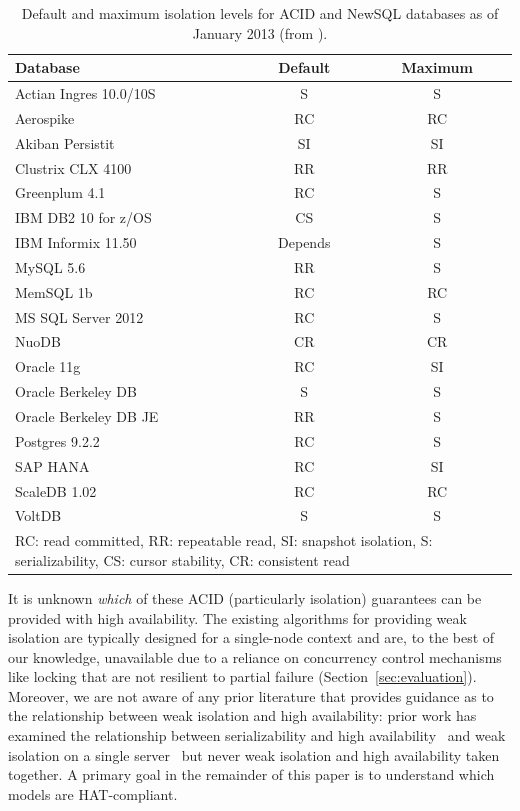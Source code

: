\begin{table}
\begin{center}
\begin{small}
\begin{tabular}{|l|c|c|}
\hline
Database & Default & Maximum\\\hline
Actian Ingres 10.0/10S & S & S\\
Aerospike & RC & RC\\
Akiban Persistit & SI & SI\\
Clustrix CLX 4100 & RR & RR\\
Greenplum 4.1 & RC & S \\
IBM DB2 10 for z/OS & CS & S\\
IBM Informix 11.50 & Depends & S\\
MySQL 5.6 & RR & S \\
MemSQL 1b & RC & RC\\
MS SQL Server 2012 & RC & S \\
NuoDB & CR & CR\\
Oracle 11g & RC & SI\\
Oracle Berkeley DB & S & S\\
Oracle Berkeley DB JE & RR & S\\
Postgres 9.2.2 & RC & S\\
SAP HANA & RC & SI\\
ScaleDB 1.02 & RC & RC\\
VoltDB & S & S\\
\hline
\multicolumn{3}{|p{7cm}|}{{\footnotesize RC: read committed, RR: repeatable read, SI: snapshot isolation, S: serializability, CS: cursor stability, CR: consistent read}}\\\hline

\end{tabular}
\caption{Default and maximum isolation levels for ACID and NewSQL
  databases as of January 2013 (from
  \protect\cite{hat-hotos}).}\vspace{-1.5em}
\label{table:existing}
\end{small}
\end{center}
\end{table}

It is unknown \textit{which} of these ACID (particularly isolation)
guarantees can be provided with high availability. The existing
algorithms for providing weak isolation are typically designed for a
single-node context and are, to the best of our knowledge, unavailable
due to a reliance on concurrency control mechanisms like locking that
are not resilient to partial failure
(Section~\ref{sec:evaluation}). Moreover, we are not aware of any prior
literature that provides guidance as to the relationship between weak
isolation and high availability: prior work has examined the
relationship between serializability and high
availability~\cite{davidson-survey} and weak isolation on a single
server~\cite{adya, ansicritique, gray-isolation} but never weak
isolation and high availability taken together.  A primary goal in the
remainder of this paper is to understand which models are
HAT-compliant.

